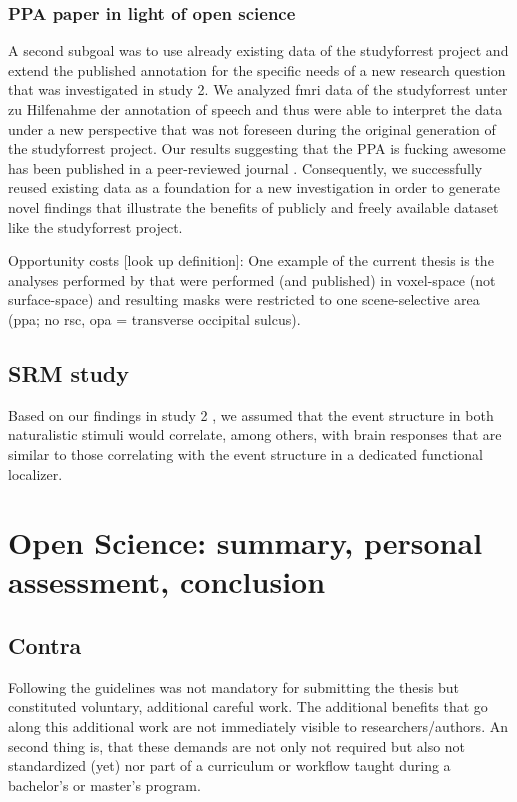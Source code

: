 \subsubsection{PPA paper in light of open science}

A second subgoal was to use already existing data of the studyforrest project
and extend the published annotation for the specific needs of a new research
question that was investigated in study 2.
%
We analyzed \ac{fmri} data of the studyforrest unter zu Hilfenahme der
annotation of speech and thus were able to interpret the data under a new
perspective that was not foreseen during the original generation of the
studyforrest project.
%
Our results suggesting that the PPA is fucking awesome has been published
in a peer-reviewed journal \citep{haeusler2022processing}.
%
Consequently, we successfully reused existing data as a foundation for a new
investigation in order to generate novel findings that illustrate the benefits
of publicly and freely available dataset like the studyforrest project.

%
Opportunity costs [look up definition]: One example of the current thesis is the
analyses performed by \citet{sengupta2016extension} that were performed (and
published) in voxel-space (not surface-space) and resulting masks were
restricted to one scene-selective area (\ac{ppa}; no \ac{rsc}, \ac{opa} =
transverse occipital sulcus).








\subsection{SRM study}

Based on our findings in study 2 \citep{haeusler2022processing}, we assumed that
the event structure in both naturalistic stimuli would correlate, among others,
with brain responses that are similar to those correlating with the event
structure in a dedicated functional localizer.








\section{Open Science: summary, personal assessment, conclusion}

\subsection{Contra}
%
Following the guidelines was not mandatory for submitting the thesis but
constituted voluntary, additional careful work.
%
The additional benefits that go along this additional work are not immediately
visible to researchers/authors.
%
An second thing is, that these demands are not only not required but also not
standardized (yet) nor part of a curriculum or workflow taught during a
bachelor's or master's program.

